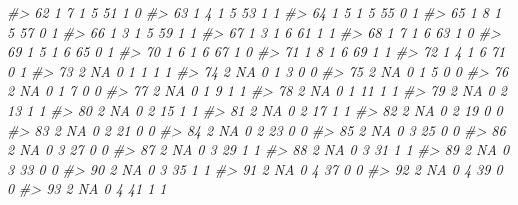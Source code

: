 \documentclass[]{book}
\newenvironment{Shaded}{\begin{snugshade}}{\end{snugshade}}
\newcommand{\CommentTok}[1]{\textcolor[rgb]{0.56,0.35,0.01}{\textit{#1}}}
\begin{document}
\begin{Shaded}
\begin{Highlighting}[]
\CommentTok{#> 62      1         7         1     5    51           1            0}
\CommentTok{#> 63      1         4         1     5    53           1            1}
\CommentTok{#> 64      1         5         1     5    55           0            1}
\CommentTok{#> 65      1         8         1     5    57           0            1}
\CommentTok{#> 66      1         3         1     5    59           1            1}
\CommentTok{#> 67      1         3         1     6    61           1            1}
\CommentTok{#> 68      1         7         1     6    63           1            0}
\CommentTok{#> 69      1         5         1     6    65           0            1}
\CommentTok{#> 70      1         6         1     6    67           1            0}
\CommentTok{#> 71      1         8         1     6    69           1            1}
\CommentTok{#> 72      1         4         1     6    71           0            1}
\CommentTok{#> 73      2        NA         0     1     1           1            1}
\CommentTok{#> 74      2        NA         0     1     3           0            0}
\CommentTok{#> 75      2        NA         0     1     5           0            0}
\CommentTok{#> 76      2        NA         0     1     7           0            0}
\CommentTok{#> 77      2        NA         0     1     9           1            1}
\CommentTok{#> 78      2        NA         0     1    11           1            1}
\CommentTok{#> 79      2        NA         0     2    13           1            1}
\CommentTok{#> 80      2        NA         0     2    15           1            1}
\CommentTok{#> 81      2        NA         0     2    17           1            1}
\CommentTok{#> 82      2        NA         0     2    19           0            0}
\CommentTok{#> 83      2        NA         0     2    21           0            0}
\CommentTok{#> 84      2        NA         0     2    23           0            0}
\CommentTok{#> 85      2        NA         0     3    25           0            0}
\CommentTok{#> 86      2        NA         0     3    27           0            0}
\CommentTok{#> 87      2        NA         0     3    29           1            1}
\CommentTok{#> 88      2        NA         0     3    31           1            1}
\CommentTok{#> 89      2        NA         0     3    33           0            0}
\CommentTok{#> 90      2        NA         0     3    35           1            1}
\CommentTok{#> 91      2        NA         0     4    37           0            0}
\CommentTok{#> 92      2        NA         0     4    39           0            0}
\CommentTok{#> 93      2        NA         0     4    41           1            1}

\end{Highlighting}
\end{Shaded}
\end{document}
